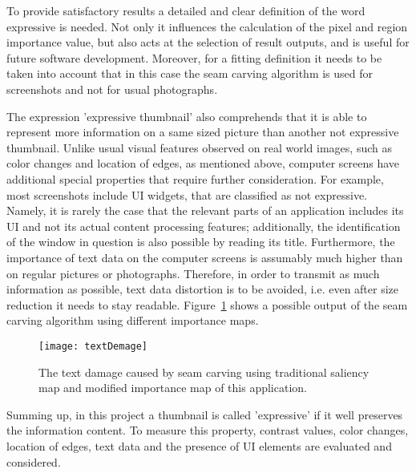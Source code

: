 \documentclass[draft,final]{vutinfth} %
\begin{document}
	To provide satisfactory results a detailed and clear definition of the word expressive is needed.
	Not only it influences the calculation of the pixel and region importance value, but also acts at the selection of result outputs, and is useful for future software development.
	Moreover, for a fitting definition it needs to be taken into account that in this case the seam carving algorithm is used for screenshots and not for usual photographs.\par 
	The expression 'expressive thumbnail' also comprehends that it is able to represent more information on a same sized picture than another not expressive thumbnail.
	Unlike usual visual features observed on real world images, such as color changes and location of edges, as mentioned above, computer screens have additional special properties that require further consideration.
	For example, most screenshots include UI widgets, that are classified as not expressive.
	Namely, it is rarely the case that the relevant parts of an application includes its UI and not its actual content processing features; additionally, the identification of the window in question is also possible by reading its title.
	Furthermore, the importance of text data on the computer screens is assumably much higher than on regular pictures or photographs. 
	Therefore, in order to transmit as much information as possible, text data distortion is to be avoided, i.e. even after size reduction it needs to stay readable.
	Figure~\ref{fig:textDamage} shows a possible output of the seam carving algorithm using different importance maps.\par 
	\begin{figure}[H]
		\centering		
		\texttt{[image: textDemage]}
		\caption{The text damage caused by seam carving using traditional saliency map and modified importance map of this application. }
		\label{fig:textDamage}
	\end{figure} 
	Summing up, in this project a thumbnail is called 'expressive' if it well preserves the information content.
	To measure this property, contrast values, color changes, location of edges, text data and the presence of UI elements are evaluated and considered.            
	
\end{document}
